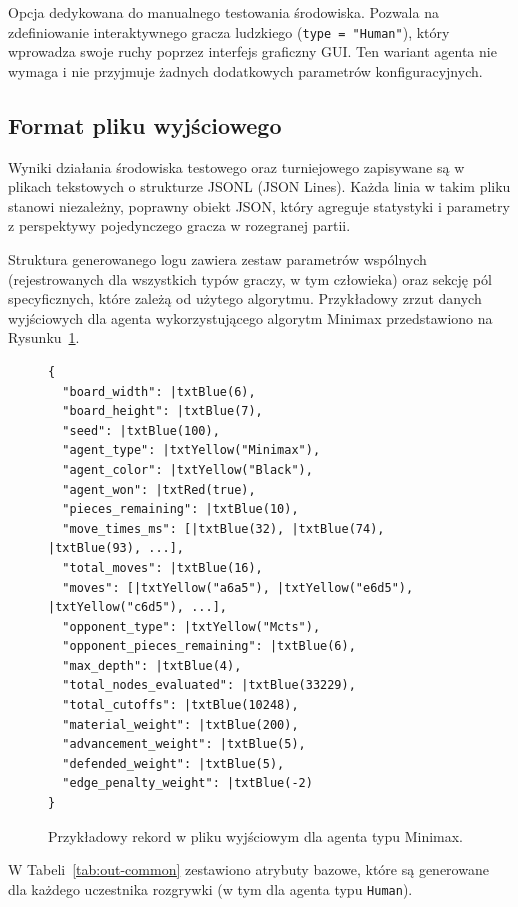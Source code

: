 \documentclass{article}
\begin{document}
Opcja dedykowana do manualnego testowania środowiska. Pozwala na zdefiniowanie interaktywnego gracza ludzkiego (\texttt{type = "Human"}), który wprowadza swoje ruchy poprzez interfejs graficzny GUI. Ten wariant agenta nie wymaga i nie przyjmuje żadnych dodatkowych parametrów konfiguracyjnych.

\subsection{Format pliku wyjściowego}

Wyniki działania środowiska testowego oraz turniejowego zapisywane są w plikach tekstowych o strukturze JSONL (JSON Lines). Każda linia w takim pliku stanowi niezależny, poprawny obiekt JSON, który agreguje statystyki i parametry z perspektywy pojedynczego gracza w rozegranej partii.

Struktura generowanego logu zawiera zestaw parametrów wspólnych (rejestrowanych dla wszystkich typów graczy, w tym człowieka) oraz sekcję pól specyficznych, które zależą od użytego algorytmu. Przykładowy zrzut danych wyjściowych dla agenta wykorzystującego algorytm Minimax przedstawiono na Rysunku~\ref{fig:output-example}.

\begin{figure}[H]
\small
\centering
\begin{Verbatim}[commandchars=\|\(\)]
{
  "board_width": |txtBlue(6),
  "board_height": |txtBlue(7),
  "seed": |txtBlue(100),
  "agent_type": |txtYellow("Minimax"),
  "agent_color": |txtYellow("Black"),
  "agent_won": |txtRed(true),
  "pieces_remaining": |txtBlue(10),
  "move_times_ms": [|txtBlue(32), |txtBlue(74), |txtBlue(93), ...],
  "total_moves": |txtBlue(16),
  "moves": [|txtYellow("a6a5"), |txtYellow("e6d5"), |txtYellow("c6d5"), ...],
  "opponent_type": |txtYellow("Mcts"),
  "opponent_pieces_remaining": |txtBlue(6),
  "max_depth": |txtBlue(4),
  "total_nodes_evaluated": |txtBlue(33229),
  "total_cutoffs": |txtBlue(10248),
  "material_weight": |txtBlue(200),
  "advancement_weight": |txtBlue(5),
  "defended_weight": |txtBlue(5),
  "edge_penalty_weight": |txtBlue(-2)
}
\end{Verbatim}
\caption{Przykładowy rekord w pliku wyjściowym dla agenta typu Minimax.}
\label{fig:output-example}
\end{figure}

\noindent
W Tabeli~\ref{tab:out-common} zestawiono atrybuty bazowe, które są generowane dla każdego uczestnika rozgrywki (w tym dla agenta typu \texttt{Human}).
\end{document}
